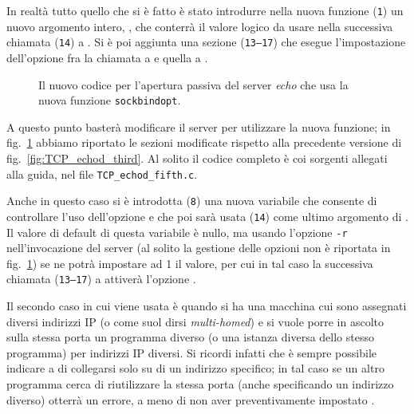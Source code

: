 In realtà tutto quello che si è fatto è stato introdurre nella nuova funzione
(\texttt{\small 1}) un nuovo argomento intero, , che conterrà il
valore logico da usare nella successiva chiamata (\texttt{\small 14}) a
. Si è poi aggiunta una sezione (\texttt{\small 13--17}) che
esegue l'impostazione dell'opzione fra la chiamata a  e quella a
.

\begin{figure}[!htbp] 
  \footnotesize \centering
  \begin{minipage}[c]{\codesamplewidth}
  \end{minipage}
  \normalsize
  \caption{Il nuovo codice per l'apertura passiva del server \textit{echo} che
    usa la nuova funzione \texttt{sockbindopt}.}
  \label{fig:TCP_echod_fifth}
\end{figure}

A questo punto basterà modificare il  server per utilizzare la nuova
funzione; in fig.~\ref{fig:TCP_echod_fifth} abbiamo riportato le sezioni
modificate rispetto alla precedente versione di
fig.~\ref{fig:TCP_echod_third}. Al solito il codice completo è coi sorgenti
allegati alla guida, nel file \texttt{TCP\_echod\_fifth.c}.

Anche in questo caso si è introdotta (\texttt{\small 8}) una nuova variabile
 che consente di controllare l'uso dell'opzione e che poi sarà
usata (\texttt{\small 14}) come ultimo argomento di . Il
valore di default di questa variabile è nullo, ma usando l'opzione \texttt{-r}
nell'invocazione del server (al solito la gestione delle opzioni non è
riportata in fig.~\ref{fig:TCP_echod_fifth}) se ne potrà impostare ad 1 il
valore, per cui in tal caso la successiva chiamata (\texttt{\small 13--17}) a
 attiverà l'opzione .

Il secondo caso in cui viene usata  è quando si ha una
macchina cui sono assegnati diversi indirizzi IP (o come suol dirsi
\textit{multi-homed}) e si vuole porre in ascolto sulla stessa porta un
programma diverso (o una istanza diversa dello stesso programma) per indirizzi
IP diversi. Si ricordi infatti che è sempre possibile indicare a 
di collegarsi solo su di un indirizzo specifico; in tal caso se un altro
programma cerca di riutilizzare la stessa porta (anche specificando un
indirizzo diverso) otterrà un errore, a meno di non aver preventivamente
impostato .

